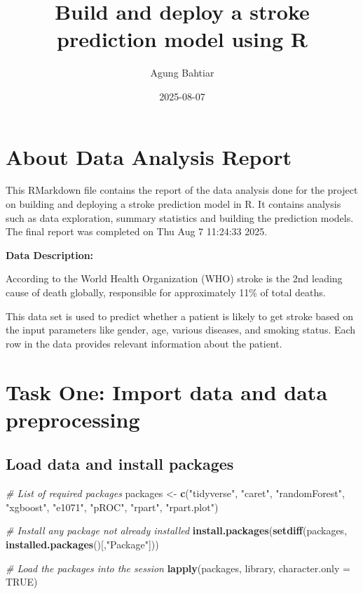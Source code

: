\documentclass[
]{article}
\title{Build and deploy a stroke prediction model using R}
\author{Agung Bahtiar}
\date{2025-08-07}
\newenvironment{Shaded}{\begin{snugshade}}{\end{snugshade}}
\newcommand{\AttributeTok}[1]{\textcolor[rgb]{0.13,0.29,0.53}{#1}}
\newcommand{\CommentTok}[1]{\textcolor[rgb]{0.56,0.35,0.01}{\textit{#1}}}
\newcommand{\ConstantTok}[1]{\textcolor[rgb]{0.56,0.35,0.01}{#1}}
\newcommand{\FunctionTok}[1]{\textcolor[rgb]{0.13,0.29,0.53}{\textbf{#1}}}
\newcommand{\NormalTok}[1]{#1}
\newcommand{\OtherTok}[1]{\textcolor[rgb]{0.56,0.35,0.01}{#1}}
\newcommand{\StringTok}[1]{\textcolor[rgb]{0.31,0.60,0.02}{#1}}
\begin{document}
\maketitle

\section{About Data Analysis Report}\label{about-data-analysis-report}

This RMarkdown file contains the report of the data analysis done for
the project on building and deploying a stroke prediction model in R. It
contains analysis such as data exploration, summary statistics and
building the prediction models. The final report was completed on Thu
Aug 7 11:24:33 2025.

\textbf{Data Description:}

According to the World Health Organization (WHO) stroke is the 2nd
leading cause of death globally, responsible for approximately 11\% of
total deaths.

This data set is used to predict whether a patient is likely to get
stroke based on the input parameters like gender, age, various diseases,
and smoking status. Each row in the data provides relevant information
about the patient.

\section{Task One: Import data and data
preprocessing}\label{task-one-import-data-and-data-preprocessing}

\subsection{Load data and install
packages}\label{load-data-and-install-packages}

\begin{Shaded}
\begin{Highlighting}[]
\CommentTok{\# List of required packages}
\NormalTok{packages }\OtherTok{\textless{}{-}} \FunctionTok{c}\NormalTok{(}\StringTok{"tidyverse"}\NormalTok{, }\StringTok{"caret"}\NormalTok{, }\StringTok{"randomForest"}\NormalTok{, }\StringTok{"xgboost"}\NormalTok{, }\StringTok{"e1071"}\NormalTok{, }\StringTok{"pROC"}\NormalTok{, }\StringTok{"rpart"}\NormalTok{, }\StringTok{"rpart.plot"}\NormalTok{)}

\CommentTok{\# Install any package not already installed}
\FunctionTok{install.packages}\NormalTok{(}\FunctionTok{setdiff}\NormalTok{(packages, }\FunctionTok{installed.packages}\NormalTok{()[,}\StringTok{"Package"}\NormalTok{]))}

\CommentTok{\# Load the packages into the session}
\FunctionTok{lapply}\NormalTok{(packages, library, }\AttributeTok{character.only =} \ConstantTok{TRUE}\NormalTok{)}
\end{Highlighting}
\end{Shaded}
\end{document}
